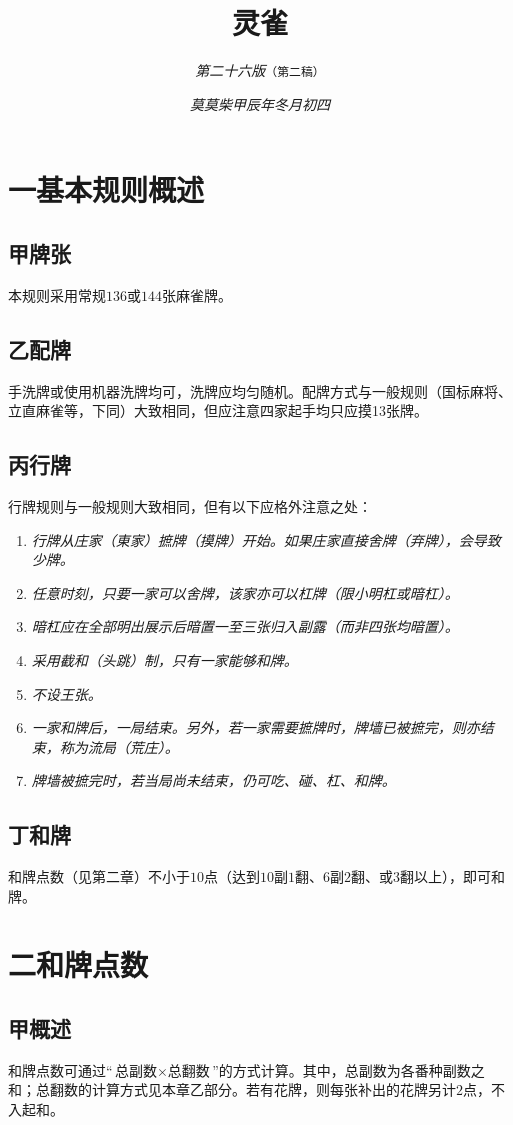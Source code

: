 \documentclass[UTF8]{article}
\title{\textbf{灵雀}}
\author{\textit{第二十六版}\texttt{（第二稿）}\rmf}
\date{\textit{莫莫柴\q 甲辰年冬月初四}}
\newcommand{\q}{\quad}
\begin{document}
  \maketitle
  \section*{一\q 基本规则概述}
  \subsection*{甲\q 牌张}
  本规则采用常规$136$或$144$张麻雀牌。
  \subsection*{乙\q 配牌}
  手洗牌或使用机器洗牌均可，洗牌应均匀随机。配牌方式与一般规则（国标麻将、立直麻雀等，下同）大致相同，但应注意四家起手均只应摸13张牌。
  \subsection*{丙\q 行牌}
  行牌规则与一般规则大致相同，但有以下应格外注意之处：\vspace{-0.9ex}
  \begin{enumerate}
    \item\it 行牌从庄家（東家）摭牌（摸牌）开始。如果庄家直接舍牌（弃牌），会导致少牌。\rm
    \item\it 任意时刻，只要一家可以舍牌，该家亦可以杠牌（限小明杠或暗杠）。\rm
    \item\it 暗杠应在全部明出展示后暗置一至三张归入副露（而非四张均暗置）。\rm
    \item\it 采用截和（头跳）制，只有一家能够和牌。\rm
    \item\it 不设王张。\rm
    \item\it 一家和牌后，一局结束。另外，若一家需要摭牌时，牌墙已被摭完，则亦结束，称为流局（荒庄）。\rm
    \item\it 牌墙被摭完时，若当局尚未结束，仍可吃、碰、杠、和牌。\rm
  \end{enumerate}
  \subsection*{丁\q 和牌}
  和牌点数（见第二章）不小于$10$点（达到$10$副$1$翻、$6$副$2$翻、或$3$翻以上），即可和牌。
  \newpage
  \section*{二\q 和牌点数}
  \subsection*{甲\q 概述}
  和牌点数可通过“$\text{总副数}\times\text{总翻数}$”的方式计算。其中，总副数为各番种副数之和；总翻数的计算方式见本章乙部分。若有花牌，则每张补出的花牌另计$2$点，不入起和。
  
\end{document}
